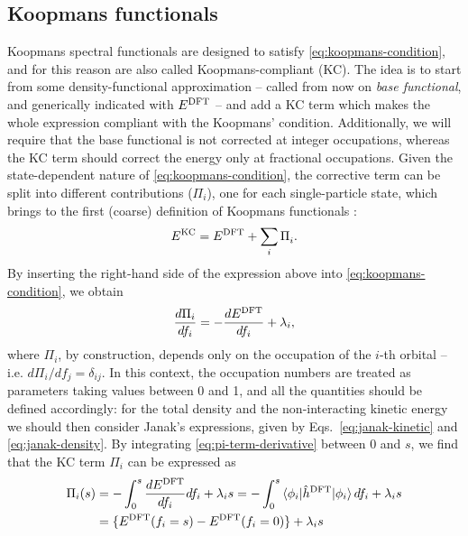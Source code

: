 
\subsection{Koopmans functionals\label{sec:koopmans-functionals}}
Koopmans spectral functionals are designed to satisfy \cref{eq:koopmans-condition}, and for this reason are also called Koopmans-compliant (KC). The idea is to start from some density-functional approximation -- called from now on \emph{base functional}, and generically indicated with $E^{\rm DFT}$ -- and add a KC term which makes the whole expression compliant with the Koopmans' condition. Additionally, we will require that the base functional is not corrected at integer occupations, whereas the KC term should correct the energy only at fractional occupations. Given the state-dependent nature of \cref{eq:koopmans-condition}, the corrective term can be split into different contributions ($\Pi_i$), one for each single-particle state, which brings to the first (coarse) definition of Koopmans functionals  \cite{dabo_non-koopmans_2009,dabo_koopmans_2010}:
%
\begin{equation}
    E^{\rm KC} = E^{\rm DFT} + \sum_i \Pi_i^{\rm} .
    \label{eq:kc-functional-coarse}
\end{equation}
%
By inserting the right-hand side of the expression above into \cref{eq:koopmans-condition}, we obtain
%
\begin{equation}
    \frac{d\Pi_i}{df_i} = - \frac{dE^{\rm DFT}}{df_i} + \lambda_i ,
    \label{eq:pi-term-derivative}
\end{equation}
%
where $\Pi_i$, by construction, depends only on the occupation of the $i$-th orbital -- i.e. $d\Pi_i / df_j = \delta_{ij}$. In this context, the occupation numbers are treated as parameters taking values between 0 and 1, and all the quantities should be defined accordingly: for the total density and the non-interacting kinetic energy we should then consider Janak's expressions, given by Eqs.~\eqref{eq:janak-kinetic} and \eqref{eq:janak-density}. By integrating \cref{eq:pi-term-derivative} between 0 and $s$, we find that the KC term $\Pi_i$ can be expressed as
%
\begin{equation}
    \begin{split}
    \Pi_i(s) &= - \int_0^{s} \frac{dE^{\rm DFT}}{df_i} df_i + \lambda_i s =
    - \int_0^{s} \braket{\phi_i|\hat{h}^{\rm DFT}|\phi_i} df_i + \lambda_i s \\
    &= \{ E^{\rm DFT}(f_i=s) - E^{\rm DFT}(f_i=0) \} + \lambda_i s
    \end{split}
    \label{eq:pi-term-general}
\end{equation}
